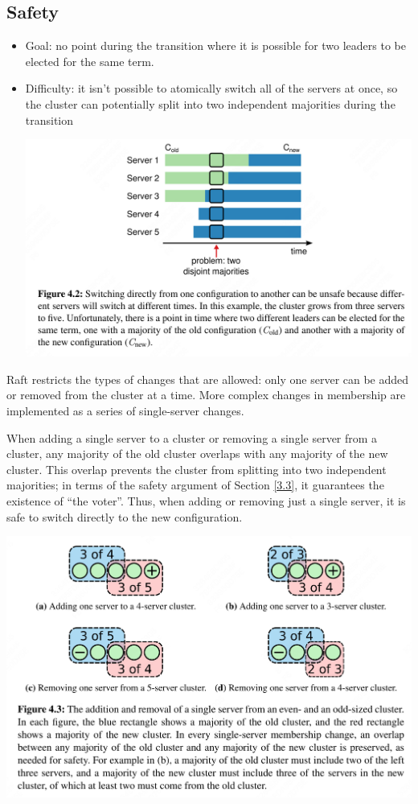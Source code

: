 \documentclass[11pt]{article}
\begin{document}
\subsection{Safety}
\label{sec:org43557f7}
\begin{itemize}
\item Goal: no point during the transition where it is possible for two leaders to be elected for the same term.
\item Difficulty: it isn’t possible to atomically switch all of the servers at once, so the cluster can
potentially split into two independent majorities during the transition
\begin{center}
\includegraphics[width=.99\textwidth]{../../images/papers/15.png}
\label{4.2}
\end{center}
\end{itemize}

Raft restricts the types of changes that are allowed: only one server can be added or removed from the
cluster at a time. More complex changes in membership are implemented as a series of single-server
changes.

When adding a single server to a cluster or removing a single server from a cluster, any majority of
the old cluster overlaps with any majority of the new cluster. This overlap prevents the cluster from
splitting into two independent majorities; in terms of the safety argument of Section \ref{3.3}, it
guarantees the existence of “the voter”. Thus, when adding or removing just a single server, it is
safe to switch directly to the new configuration.

\begin{center}
\includegraphics[width=.99\textwidth]{../../images/papers/16.png}
\label{}
\end{center}
\end{document}
